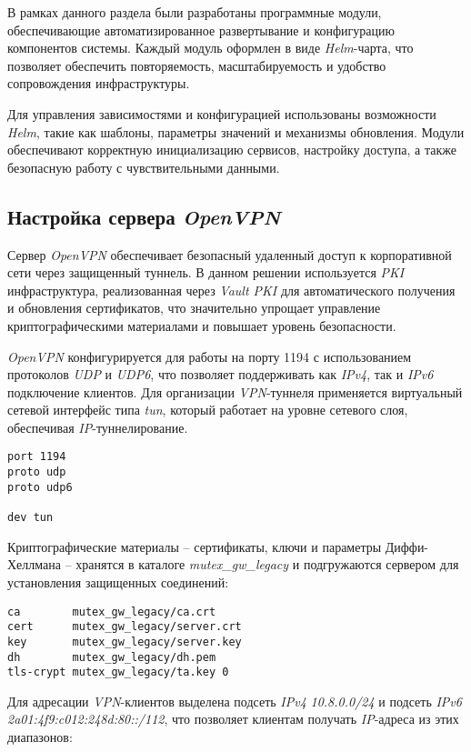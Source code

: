 В рамках данного раздела были разработаны программные модули, обеспечивающие автоматизированное развертывание и конфигурацию компонентов системы. Каждый модуль оформлен в виде \textit{Helm}-чарта, что позволяет обеспечить повторяемость, масштабируемость и удобство сопровождения инфраструктуры.

Для управления зависимостями и конфигурацией использованы возможности \textit{Helm}, такие как шаблоны, параметры значений и механизмы обновления. Модули обеспечивают корректную инициализацию сервисов, настройку доступа, а также безопасную работу с чувствительными данными.

\subsection{Настройка сервера \textit{OpenVPN}}

Сервер \textit{OpenVPN} обеспечивает безопасный удаленный доступ к корпоративной сети через защищенный туннель. В данном решении используется \textit{PKI} инфраструктура, реализованная через \textit{Vault PKI} для автоматического получения и обновления сертификатов, что значительно упрощает управление криптографическими материалами и повышает уровень безопасности.

\textit{OpenVPN} конфигурируется для работы на порту 1194 с использованием протоколов \textit{UDP} и \textit{UDP6}, что позволяет поддерживать как \textit{IPv4}, так и \textit{IPv6} подключение клиентов. Для организации \textit{VPN}-туннеля применяется виртуальный сетевой интерфейс типа \textit{tun}, который работает на уровне сетевого слоя, обеспечивая \textit{IP}-туннелирование.

\begin{lstlisting}
port 1194
proto udp
proto udp6

dev tun
\end{lstlisting}

Криптографические материалы -- сертификаты, ключи и параметры Диффи-Хеллмана -- хранятся в каталоге \textit{mutex\_gw\_legacy} и подгружаются сервером для установления защищенных соединений:

\begin{lstlisting}
ca        mutex_gw_legacy/ca.crt
cert      mutex_gw_legacy/server.crt
key       mutex_gw_legacy/server.key
dh        mutex_gw_legacy/dh.pem
tls-crypt mutex_gw_legacy/ta.key 0
\end{lstlisting}

Для адресации \textit{VPN}-клиентов выделена подсеть \textit{IPv4} \textit{10.8.0.0/24} и подсеть \textit{IPv6} \textit{2a01:4f9:c012:248d:80::/112}, что позволяет клиентам получать \textit{IP}-адреса из этих диапазонов:

